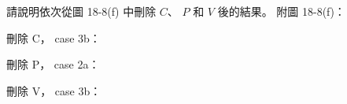 \startEXERCISE
請說明依次從圖 18-8(f) 中刪除 $C$、 $P$ 和 $V$ 後的結果。
附圖 18-8(f)：

\stopEXERCISE

\startANSWER
刪除 C， case 3b：

\externalfigure[output/e18_3-1-1]

刪除 P， case 2a：

\externalfigure[output/e18_3-1-2]

刪除 V， case 3b：

\externalfigure[output/e18_3-1-3]

\stopANSWER